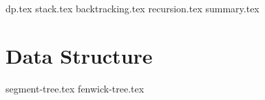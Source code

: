 \documentclass{../latex-setting/cmemoir}
\begin{document}

\frontmatter

\tableofcontents

\restoregeometry%

\mainmatter{}


{dp.tex}
{stack.tex}
{backtracking.tex}
{recursion.tex}
{summary.tex}


\part{Data Structure}
{segment-tree.tex}
{fenwick-tree.tex}
% 
\end{document}
